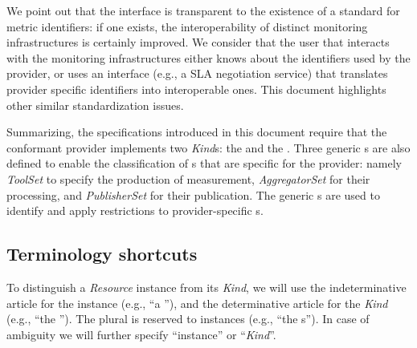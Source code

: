 \documentclass[12pt]{article}  %
\begin{document}


We point out that the interface is transparent to the existence of a standard for metric identifiers: if one exists, the interoperability of distinct monitoring infrastructures is certainly improved. We consider that the user that interacts with the monitoring infrastructures either knows about the identifiers used by the provider, or uses an interface (e.g., a SLA negotiation service) that translates provider specific identifiers into interoperable ones. This document highlights other similar standardization issues.

Summarizing, the specifications introduced in this document require that the conformant provider implements two {\em Kind}s: the {\em \coll } and the {\em \sens }. Three generic \mi s are also defined to enable the classification of \mi s that are specific for the provider: namely {\em ToolSet} to specify the production of measurement, {\em AggregatorSet} for their processing, and {\em PublisherSet} for their publication. The generic \mi s are used to identify and apply restrictions to provider-specific \mi s. 

\subsection{Terminology shortcuts}

To distinguish a {\em Resource} instance from its {\em Kind}, we will use the indeterminative article for the instance (e.g., ``a \rs''), and the determinative article for the {\em Kind} (e.g., ``the \rs''). The plural is reserved to instances (e.g., ``the \rs s''). In case of ambiguity we will further specify ``instance'' or ``{\em Kind}''. 
\end{document}
